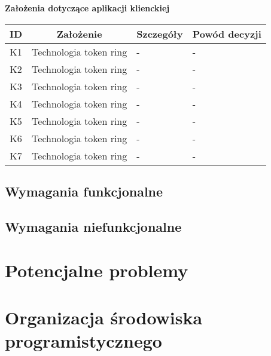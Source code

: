 \begin{center}
\par{\textbf{Założenia dotyczące aplikacji klienckiej}}
\begin{tabular}{|c|c|l|l|}
\hline
\textbf{ID} & \textbf{Założenie} & \textbf{Szczegóły} & \textbf{Powód decyzji} \\
\hline
\label{z:k1} K1 & Technologia token ring &  - & - \\
\hline
\label{z:k2} K2 & Technologia token ring &  - & - \\
\hline
\label{z:k3} K3 & Technologia token ring &  - & - \\
\hline
\label{z:k4} K4 & Technologia token ring &  - & - \\
\hline
\label{z:k5} K5 & Technologia token ring &  - & - \\
\hline
\label{z:k6} K6 & Technologia token ring &  - & - \\
\hline
\label{z:k7} K7 & Technologia token ring &  - & - \\
\hline
\end{tabular} 

\end{center}

\subsection[Wymagania funkcjonalne]{Wymagania funkcjonalne}

\subsection[Wymagania niefunkcjonalne]{Wymagania niefunkcjonalne}

\section[Potencjalne problemy]{Potencjalne problemy}

\section[Organizacja środowiska programistycznego]{Organizacja środowiska programistycznego}
